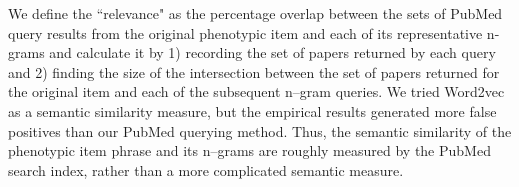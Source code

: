 \documentclass{sig-alternate}
\begin{document}

We define the ``relevance" as the percentage overlap between the sets of PubMed query results from the original phenotypic item and each of its representative n-grams and calculate it by 1) recording the set of papers returned by each query and 2) finding the size of the intersection between the set of papers returned for the original item and each of the subsequent n--gram queries.
We tried Word2vec \cite{Mikolov:2013wc} as a semantic similarity measure, but the empirical results generated more false positives than our PubMed querying method.
Thus, the semantic similarity of the phenotypic item phrase and its n--grams are roughly measured by the PubMed search index, rather than a more complicated semantic measure.

\end{document}
